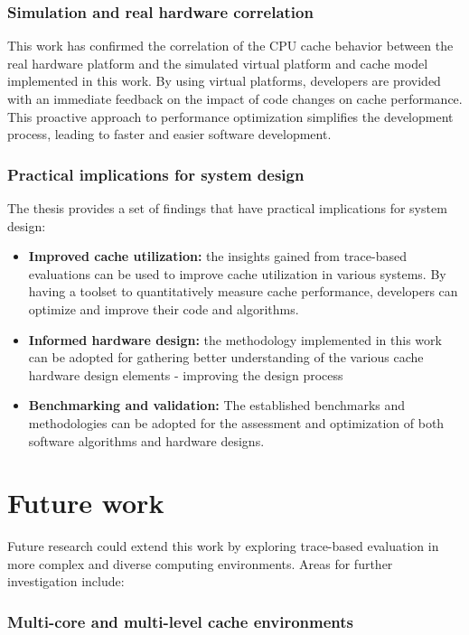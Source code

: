 \subsubsection*{Simulation and real hardware correlation}

This work has confirmed the correlation of the CPU cache behavior between the real hardware platform and the simulated virtual platform and cache model implemented in this work. By
using virtual platforms, developers are provided with an immediate feedback on the impact of code changes on cache performance. This proactive approach to performance optimization
simplifies the development process, leading to faster and easier software development.

\subsubsection*{Practical implications for system design}

The thesis provides a set of findings that have practical implications for system design:

\begin{itemize}
	\item \textbf{Improved cache utilization:} the insights gained from trace-based evaluations can be used to improve cache utilization in various systems. By having a toolset to
		quantitatively measure cache performance, developers can optimize and improve their code and algorithms.
	\item \textbf{Informed hardware design:} the methodology implemented in this work can be adopted for gathering better understanding of the various cache hardware design elements -
		improving the design process
	\item \textbf{Benchmarking and validation:} The established benchmarks and methodologies can be adopted for the assessment and optimization of both software algorithms and hardware designs.
\end{itemize}

\section{Future work}

Future research could extend this work by exploring trace-based evaluation in more complex and diverse computing environments. Areas for further investigation include:

\subsubsection*{Multi-core and multi-level cache environments}


